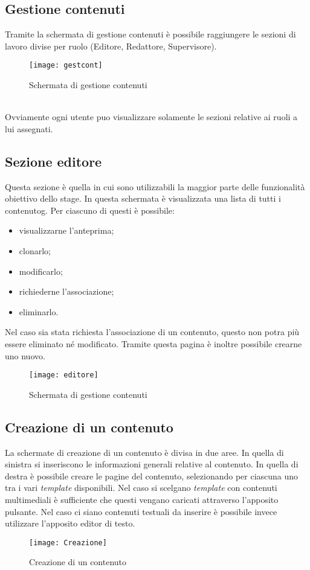\subsection{Gestione contenuti}
Tramite la schermata di gestione contenuti è possibile raggiungere le sezioni di lavoro divise per ruolo (Editore, Redattore, Supervisore).
\begin{figure}[h]
    \begin{center}
    \texttt{[image: gestcont]}
    \caption{Schermata di gestione contenuti}
    \label{fig:figure22}
    \end{center}
\end{figure}
\\Ovviamente ogni utente puo visualizzare solamente le sezioni relative ai ruoli a lui assegnati.

\subsection{Sezione editore}
Questa sezione è quella in cui sono utilizzabili la maggior parte delle funzionalità obiettivo dello stage. In questa schermata è visualizzata una lista di tutti i \gls{contenutog}. Per ciascuno di questi è possibile:
\begin{itemize}
    \item visualizzarne l'anteprima;
    \item clonarlo;
    \item modificarlo;
    \item richiederne l'associazione;
    \item eliminarlo.
\end{itemize}
Nel caso sia stata richiesta l'associazione di un contenuto, questo non potra più essere eliminato né modificato.
Tramite questa pagina è inoltre possibile crearne uno nuovo.
\begin{figure}[h]
    \begin{center}
    \texttt{[image: editore]}
    \caption{Schermata di gestione contenuti}
    \label{fig:figure23}
    \end{center}
\end{figure}

\subsection{Creazione di un contenuto}
La schermate di creazione di un contenuto è divisa in due aree. In quella di sinistra si inseriscono le informazioni generali relative al contenuto. In quella di destra è possibile creare le pagine del contenuto, selezionando per ciascuna uno tra i vari \textit{template} disponibili.
Nel caso si scelgano \textit{template} con contenuti multimediali è sufficiente che questi vengano caricati attraverso l'apposito pulsante. Nel caso ci siano contenuti testuali da inserire è possibile invece utilizzare l'apposito editor di testo.
\begin{figure}[h]
    \begin{center}
    \texttt{[image: Creazione]}
    \caption{Creazione di un contenuto}
    \label{fig:figure24}
    \end{center}
\end{figure}

